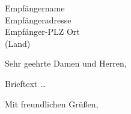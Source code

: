 \documentclass[parskip=half,%
fontsize=11pt,%
fromphone=true,%
fromemail=true
]{scrlttr2}
\begin{document}
\begin{letter}{\sffamily\large{Empfängername \\ Empfängeradresse \\ Empfänger-PLZ Ort \\ (Land)}}

\opening{Sehr geehrte Damen und Herren,}

Brieftext \dots

\closing{Mit freundlichen Grüßen,}


\end{letter}
\end{document}
